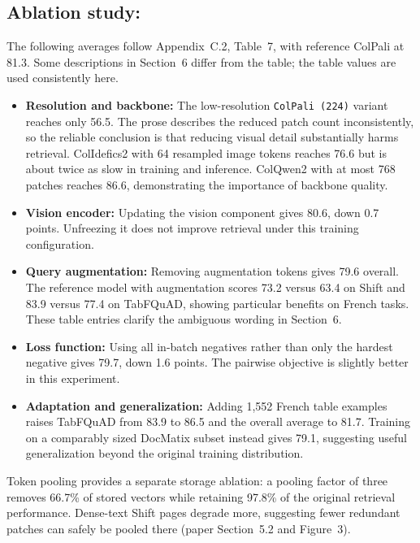 \documentclass[11pt,a4paper]{article}
\begin{document}
\subsection{Ablation study:}
The following averages follow Appendix~C.2, Table~7, with reference ColPali at 81.3. Some descriptions in Section~6 differ from the table; the table values are used consistently here.
\begin{itemize}
    \item \textbf{Resolution and backbone:} The low-resolution \texttt{ColPali (224)} variant reaches only 56.5. The prose describes the reduced patch count inconsistently, so the reliable conclusion is that reducing visual detail substantially harms retrieval. ColIdefics2 with 64 resampled image tokens reaches 76.6 but is about twice as slow in training and inference. ColQwen2 with at most 768 patches reaches 86.6, demonstrating the importance of backbone quality.
    \item \textbf{Vision encoder:} Updating the vision component gives 80.6, down 0.7 points. Unfreezing it does not improve retrieval under this training configuration.
    \item \textbf{Query augmentation:} Removing augmentation tokens gives 79.6 overall. The reference model with augmentation scores 73.2 versus 63.4 on Shift and 83.9 versus 77.4 on TabFQuAD, showing particular benefits on French tasks. These table entries clarify the ambiguous wording in Section~6.
    \item \textbf{Loss function:} Using all in-batch negatives rather than only the hardest negative gives 79.7, down 1.6 points. The pairwise objective is slightly better in this experiment.
    \item \textbf{Adaptation and generalization:} Adding 1,552 French table examples raises TabFQuAD from 83.9 to 86.5 and the overall average to 81.7. Training on a comparably sized DocMatix subset instead gives 79.1, suggesting useful generalization beyond the original training distribution.
\end{itemize}

Token pooling provides a separate storage ablation: a pooling factor of three removes 66.7\% of stored vectors while retaining 97.8\% of the original retrieval performance. Dense-text Shift pages degrade more, suggesting fewer redundant patches can safely be pooled there (paper Section~5.2 and Figure~3).
\end{document}
